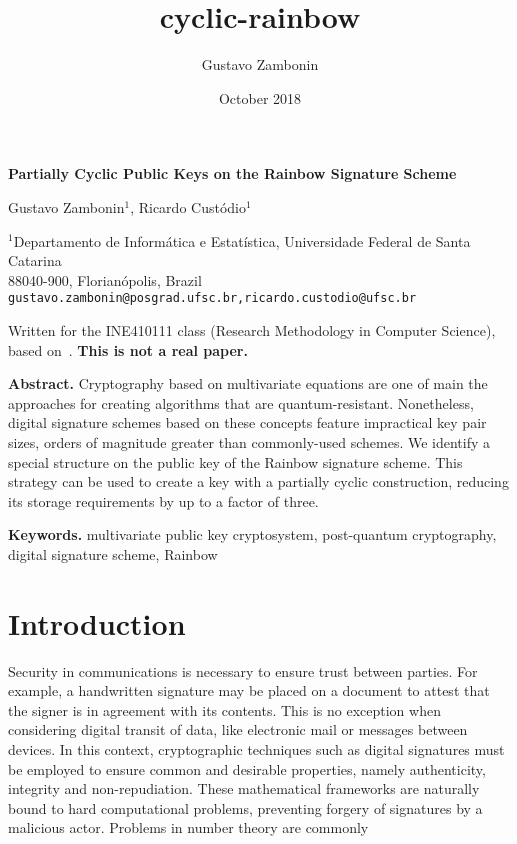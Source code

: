 \documentclass[a4paper, 14pt]{extarticle}
\title{cyclic-rainbow}
\author{Gustavo Zambonin}
\date{October 2018}
\begin{document}
\begin{center}
    {\Large\bf Partially Cyclic Public Keys on the Rainbow Signature Scheme} \vspace{.75cm}
    
    Gustavo Zambonin$^{1}$, Ricardo Custódio$^{1}$
    
    $^{1}$Departamento de Informática e Estatística, Universidade Federal de Santa Catarina \\
    88040-900, Florianópolis, Brazil \\
    \texttt{gustavo.zambonin@posgrad.ufsc.br,ricardo.custodio@ufsc.br}
    
     Written for the INE410111 class (Research Methodology in Computer Science), based on~\cite{petzoldt2013selecting}. \textbf{This is not a real paper.} \vspace{.75cm}
\end{center}

\textbf{Abstract.} Cryptography based on multivariate equations are one of main the approaches for creating algorithms that are quantum-resistant. Nonetheless, digital signature schemes based on these concepts feature impractical key pair sizes, orders of magnitude greater than commonly-used schemes. We identify a special structure on the public key of the Rainbow signature scheme. This strategy can be used to create a key with a partially cyclic construction, reducing its storage requirements by up to a factor of three.

\textbf{Keywords.} multivariate public key cryptosystem, post-quantum cryptography, digital signature scheme, Rainbow

\section{Introduction}

Security in communications is necessary to ensure trust between parties. For example, a handwritten signature may be placed on a document to attest that the signer is in agreement with its contents. This is no exception when considering digital transit of data, like electronic mail or messages between devices. In this context, cryptographic techniques such as digital signatures must be employed to ensure common and desirable properties, namely authenticity, integrity and non-repudiation. These mathematical frameworks are naturally bound to hard computational problems, preventing forgery of signatures by a malicious actor. Problems in number theory are commonly 
\end{document}
